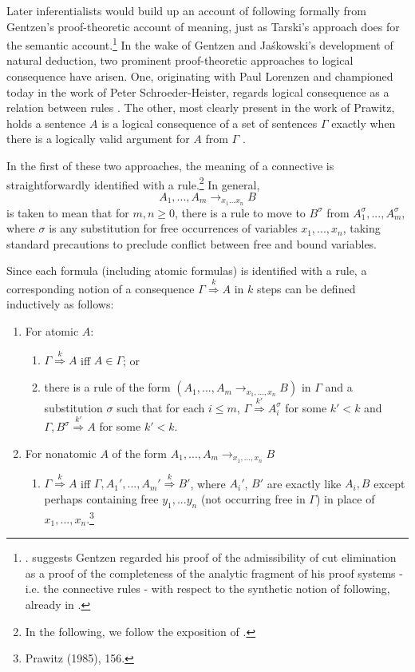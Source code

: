 \documentclass[]{article}
\begin{document}
Later inferentialists would build up an account of following formally from Gentzen's proof-theoretic account of meaning, just as Tarski's approach does for the semantic account.\footnote{\cite[159]{Prawitz1985}. \cite[366-376]{Franks2010} suggests Gentzen regarded his proof of the admissibility of cut elimination as a proof of the completeness of the analytic fragment of his proof systems - i.e. the connective rules - with respect to the synthetic notion of following, already in \cite{Gentzen1934}.} In the wake of Gentzen and Ja\'{s}kowski's development of natural deduction, two prominent proof-theoretic approaches to logical consequence have arisen. One, originating with Paul Lorenzen and championed today in the work of Peter Schroeder-Heister, regards logical consequence as a relation between rules \cite{Lorenzen1955} \cite{Schroeder-Heister1984} \cite{Schroeder-Heister2006} \cite{Schroeder-Heister2014}. The other, most clearly present in the work of Prawitz, holds a sentence $A$ is a logical consequence of a set of sentences $\Gamma$ exactly when there is a logically valid argument for $A$ from $\Gamma$ \cite{Prawitz1974} \cite{Prawitz1985}.

In the first of these two approaches, the meaning of a connective is straightforwardly identified with a rule.\footnote{In the following, we follow the exposition of \cite[sec. 2]{Prawitz1985}.} In general, \[A_{1},...,A_{m} \longrightarrow_{x_{1}...x_{n}} B\] is taken to mean that for $m, n \geq 0$, there is a rule to move to $B^{\sigma}$ from $A^{\sigma}_{1},..., A^{\sigma}_{m}$, where $\sigma$ is any substitution for free occurrences of variables $x_1, ... , x_{n}$, taking standard precautions to preclude conflict between free and bound variables.

Since each formula (including atomic formulas) is identified with a rule, a corresponding notion of a consequence $\Gamma \stackrel{k}{\Rightarrow} A$ in $k$ steps can be defined inductively as follows: 
\begin{enumerate}
\item For atomic $A$:
\begin{enumerate}
\item $\Gamma \stackrel{k}{\Rightarrow} A$ iff $A \in \Gamma$; or
\item there is a rule of the form $(A_{1}, ... , A_{m} \rightarrow_{x_{1}, ... , x_{n}} B)$ in $\Gamma$ and a substitution $\sigma$ such that for each $i\leq m$, $\Gamma \stackrel{k'}{\Rightarrow} A^{\sigma}_{i}$ for some $k' < k$ and $\Gamma, B^{\sigma}\stackrel{k'}{\Rightarrow} A$ for some $k'< k$.
\end{enumerate}
\item For nonatomic $A$ of the form $A_{1},...,A_{m}\rightarrow_{x_{1},...,x_{n}} B$
\begin{enumerate}
\item$\Gamma \stackrel{k}{\Rightarrow} A$ iff $\Gamma, A_{1}',...,A_{m}' \stackrel{k}{\Rightarrow} B'$, where $A_{i}'$, $B'$ are exactly like $A_{i}, B$ except perhaps containing free $y_{1},...y_{n}$ (not occurring free in $\Gamma$) in place of $x_{1},...,x_{n}$.\footnote{Prawitz (1985), 156.}
\end{enumerate}
\end{enumerate}
\end{document}
